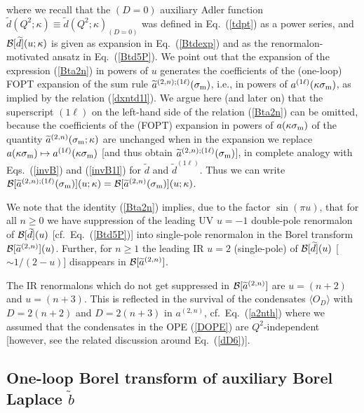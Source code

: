 \documentclass[aps,nofootinbib,showkeys,noshowpacs,preprintnumbers,amsmath,amssymb]{revtex4}
\newcommand{\sm}{{\sigma_{\rm m}}}
\newcommand{\ta}{{\widetilde a}}
\newcommand{\tb}{{\widetilde b}}
\newcommand{\td}{{\widetilde d}}
\begin{document}
where we recall that the $(D=0)$ auxiliary Adler function $\td(Q^2; \kappa) \equiv \td(Q^2; \kappa)_{(D=0)}$ was defined in Eq.~(\ref{tdpt}) as a power series, and ${\cal B}[\td](u; \kappa)$ is given as expansion in Eq.~(\ref{Btdexp}) and as the renormalon-motivated ansatz in Eq.~(\ref{Btd5P}).  We point out that the expansion of the expression (\ref{Bta2n}) in powers of $u$ generates the coefficients of the (one-loop) FOPT expansion of the sum rule $\ta^{(2,n);(1 \ell)}(\sm)$, i.e., in powers of $a^{(1 \ell)}(\kappa \sm)$, as implied by the relation (\ref{dxntd1l}). We argue here (and later on) that the superscript $(1 \ell)$ on the left-hand side of the relation (\ref{Bta2n}) can be omitted, because the coefficients of the (FOPT) expansion in powers of $a(\kappa \sm)$ of the quantity $\ta^{(2,n)}(\sm;\kappa)$ are unchanged when in the expansion we replace $a(\kappa \sm) \mapsto a^{(1 \ell)}(\kappa \sm)$ [and thus obtain $\ta^{(2,n);(1 \ell)}(\sm)$], in complete analogy with Eqs.~(\ref{invB}) and (\ref{invB1l}) for $\td$ and $\td^{(1 \ell)}$. Thus we can write ${\cal B}[\ta^{(2,n);(1 \ell)}(\sm)](u; \kappa) = {\cal B}[\ta^{(2,n)}(\sm)](u; \kappa)$.

We note that the identity (\ref{Bta2n}) implies, due to the factor $\sin (\pi u)$, that for all $n \geq 0$ we have suppression of the leading UV $u=-1$ double-pole renormalon of ${\cal B}[\td](u)$ [cf.~Eq.~(\ref{Btd5P})] into single-pole renormalon in the Borel transform ${\cal B}[\ta^{(2,n)}](u)$.  Further, for $n \geq 1$ the leading IR $u=2$ (single-pole) of ${\cal B}[\td](u)$ [$\sim 1/(2-u)$] disappears in ${\cal B}[\ta^{(2,n)}]$.

The IR renormalons which do not get suppressed in ${\cal B}[\ta^{(2,n)}]$ are $u=(n+2)$ and $u=(n+3)$. This is reflected in the survival of the condensates $\langle O_D \rangle$ with $D=2(n+2)$ and $D=2(n+3)$ in $a^{(2,n)}$, cf.~Eq.~(\ref{a2nth}) where we assumed that the condensates in the OPE (\ref{DOPE}) are $Q^2$-independent [however, see the related discussion around Eq.~(\ref{dD6})]. 

\subsection{One-loop Borel transform of auxiliary Borel Laplace $\tb$}
\label{app:tb}
\end{document}
